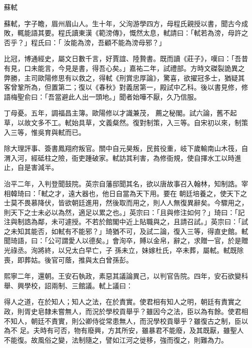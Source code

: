 
\begin{pinyinscope}
蘇軾



 蘇軾，字子瞻，眉州眉山人。生十年，父洵游學四方，母程氏親授以書，聞古今成敗，輒能語其要。程氏讀東漢《範滂傳》，慨然太息，軾請曰：「軾若為滂，母許之否乎？」程氏曰：「
 汝能為滂，吾顧不能為滂母邪？」



 比冠，博通經史，屬文日數千言，好賈誼、陸贄書。既而讀《莊子》，嘆曰：「吾昔有見，口未能言，今見是書，得吾心矣。」嘉祐二年，試禮部。方時文磔裂詭異之弊勝，主司歐陽修思有以救之，得軾《刑賞忠厚論》，驚喜，欲擢冠多士，猶疑其客曾鞏所為，但置第二；復以《春秋》對義居第一，殿試中乙科。後以書見修，修語梅聖俞曰：「吾當避此人出一頭地。」聞者始嘩不厭，久乃信服。



 丁母憂。五年，調福昌主簿。歐陽修以才識兼茂，
 薦之秘閣。試六論，舊不起草，以故文多不工。軾始具草，文義粲然。復對制策，入三等。自宋初以來，制策入三等，惟吳育與軾而已。



 除大理評事、簽書鳳翔府叛官。關中自元昊叛，民貧役重，岐下歲輸南山木筏，自渭入河，經砥柱之險，衙吏踵破家。軾訪其利害，為修衙規，使自擇水工以時進止，自是害減半。



 治平二年，入判登聞鼓院。英宗自藩邸聞其名，欲以唐故事召入翰林，知制誥。宰相韓琦曰：「軾之才，遠大器也，他日自當為天下用。要在
 朝廷培養之，使天下之士莫不畏慕降伏，皆欲朝廷進用，然後取而用之，則人人無復異辭矣。今驟用之，則天下之士未必以為然，適足以累之也。」英宗曰：「且與修注如何？」琦曰：「記注與制誥為鄰，未可遽授。不若於館閣中近上貼職與之，且請召試。」英宗曰：「試之未知其能否，如軾有不能邪？」琦猶不可，及試二論，復入三等，得直史館。軾聞琦語，曰：「公可謂愛人以德矣。」會洵卒，賻以金帛，辭之，求贈一官，於是贈光祿丞。洵將終，以兄太白早亡，子
 孫未立，妹嫁杜氏，卒未葬，屬軾。軾既除喪，即葬姑。後官可蔭，推與太白曾孫彭。



 熙寧二年，還朝。王安石執政，素惡其議論異己，以判官告院。四年，安石欲變科舉、興學校，詔兩制、三館議。軾上議曰：



 得人之道，在於知人；知人之法，在於責實。使君相有知人之明，朝廷有責實之政，則胥史皂隸未嘗無人，而況於學校貢舉乎？雖因今之法，臣以為有餘。使君相不知人，朝廷不責實，則公卿侍從常患無人，而況學校貢舉乎？雖復古之制，臣以為不
 足。夫時有可否，物有廢興，方其所安，雖暴君不能廢，及其既厭，雖聖人不能復。故風俗之變，法制隨之，譬如江河之徙移，強而復之，則難為力。




\end{pinyinscope}
